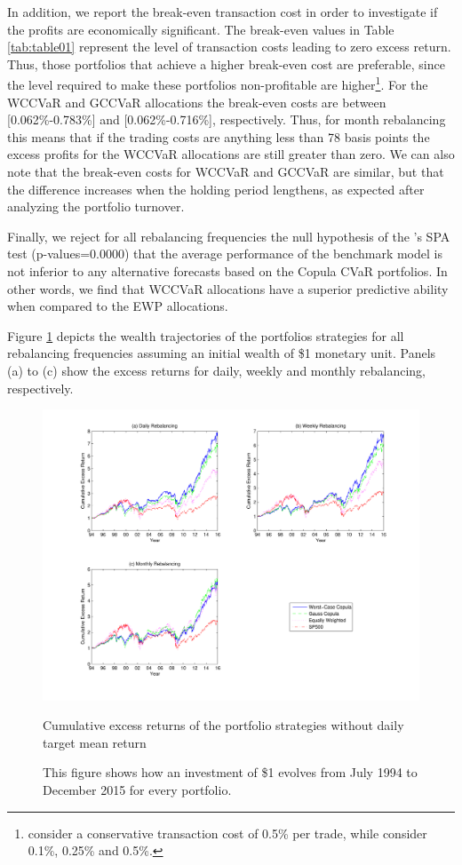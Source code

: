 \documentclass[a4paper,10pt]{article}
\begin{document}
In addition, we report the break-even transaction cost in order to investigate if the profits are economically significant. The break-even values in Table \ref{tab:table01} represent the level of transaction costs leading to zero excess return. Thus, those portfolios that achieve a higher break-even cost are preferable, since the level required to make these portfolios non-profitable are higher\footnote{\citet*{jega1993} consider a conservative transaction cost of 0.5\% per trade, while \citet*{allen1999} consider 0.1\%, 0.25\% and 0.5\%.}. For the WCCVaR and GCCVaR allocations the break-even costs are between [0.062\%-0.783\%] and [0.062\%-0.716\%], respectively. Thus, for month rebalancing this means that if the trading costs are anything less than 78 basis points the excess profits for the WCCVaR allocations are still greater than zero. We can also note that the break-even costs for WCCVaR and GCCVaR are similar, but that the
difference increases when the holding period lengthens, as expected after analyzing the portfolio turnover. 

Finally, we reject for all rebalancing frequencies the null hypothesis of the \citet*{hansen2005test}'s SPA test (p-values=0.0000) that the average performance of the benchmark model is not inferior to any alternative forecasts based on the Copula CVaR portfolios. In other words, we find that WCCVaR allocations have a superior predictive ability when compared to the EWP allocations.

Figure \ref{fig:fig01} depicts the wealth trajectories of the portfolios strategies for all rebalancing frequencies assuming an initial wealth of \$1 monetary unit. Panels (a) to (c) show the excess returns for daily, weekly and monthly rebalancing, respectively. 

\begin{figure}[!ht]
	\hspace*{-2cm} 
	\includegraphics[scale=0.65]{fig1_nogrid.pdf}
	\caption{\scriptsize Cumulative excess returns of the portfolio strategies without daily target mean return }
	\caption*{This figure shows how an investment of \$1 evolves from July 1994 to December 2015 for every portfolio.}
	\label{fig:fig01}
\end{figure}
\end{document}
